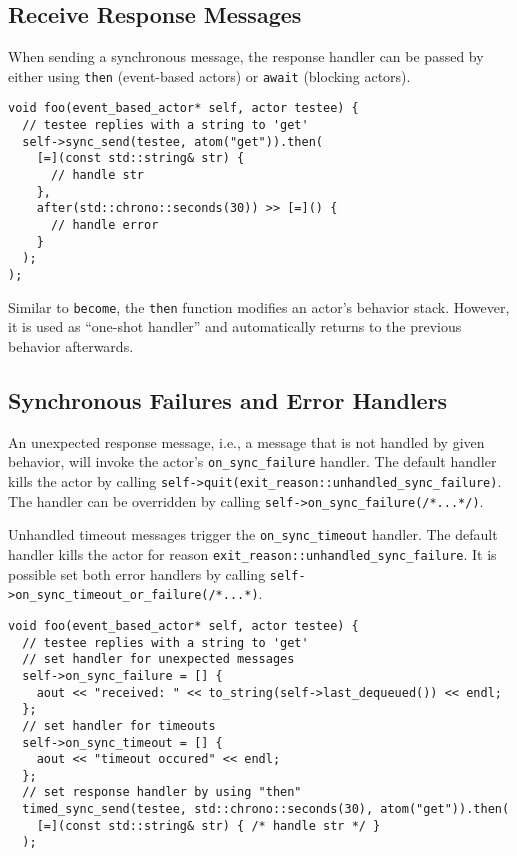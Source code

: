 \clearpage
\subsection{Receive Response Messages}

When sending a synchronous message, the response handler can be passed by either using \lstinline^then^ (event-based actors) or \lstinline^await^ (blocking actors).

\begin{lstlisting}
void foo(event_based_actor* self, actor testee) {
  // testee replies with a string to 'get'
  self->sync_send(testee, atom("get")).then(
    [=](const std::string& str) {
      // handle str
    },
    after(std::chrono::seconds(30)) >> [=]() {
      // handle error
    }
  );
);
\end{lstlisting}

Similar to \lstinline^become^, the \lstinline^then^ function modifies an actor's behavior stack.
However, it is used as ``one-shot handler'' and automatically returns to the previous behavior afterwards.

\subsection{Synchronous Failures and Error Handlers}

An unexpected response message, i.e., a message that is not handled by given behavior, will invoke the actor's \lstinline^on_sync_failure^ handler.
The default handler kills the actor by calling \lstinline^self->quit(exit_reason::unhandled_sync_failure)^.
The handler can be overridden by calling \lstinline^self->on_sync_failure(/*...*/)^.

Unhandled timeout messages trigger the \lstinline^on_sync_timeout^ handler.
The default handler kills the actor for reason \lstinline^exit_reason::unhandled_sync_failure^.
It is possible set both error handlers by calling \lstinline^self->on_sync_timeout_or_failure(/*...*)^.

\begin{lstlisting}
void foo(event_based_actor* self, actor testee) {
  // testee replies with a string to 'get'
  // set handler for unexpected messages
  self->on_sync_failure = [] {
    aout << "received: " << to_string(self->last_dequeued()) << endl;
  };
  // set handler for timeouts
  self->on_sync_timeout = [] {
    aout << "timeout occured" << endl;
  };
  // set response handler by using "then"
  timed_sync_send(testee, std::chrono::seconds(30), atom("get")).then(
    [=](const std::string& str) { /* handle str */ }
  );
\end{lstlisting}

